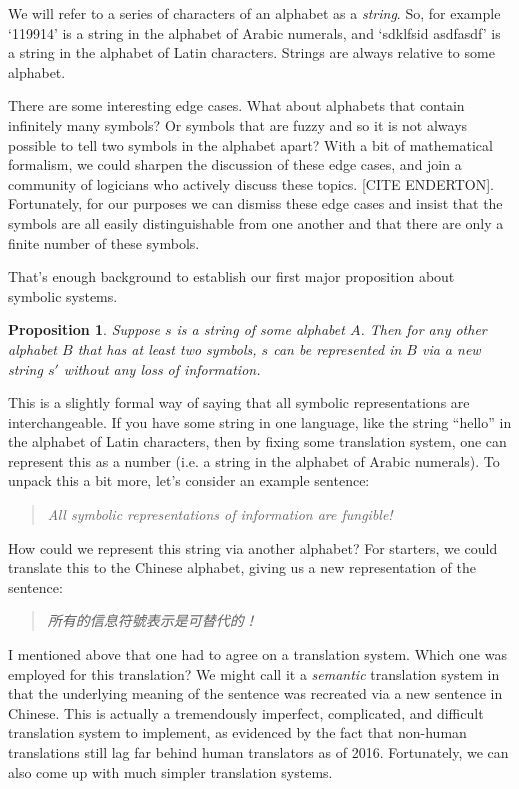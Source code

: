 \documentclass[UTF8]{book}
\newtheorem{theorem}{Proposition}
\begin{document}
\begin{CJK}{UTF8}{gbsn}
We will refer to a series of characters of an alphabet as a \emph{string}. So, for example `119914' is a string in the alphabet of Arabic numerals, and `sdklfsid asdfasdf' is a string in the alphabet of Latin characters. Strings are always relative to some alphabet.

There are some interesting edge cases. What about alphabets that contain infinitely many symbols? Or symbols that are fuzzy and so it is not always possible to tell two symbols in the alphabet apart? With a bit of mathematical formalism, we could sharpen the discussion of these edge cases, and join a community of logicians who actively discuss these topics. [CITE ENDERTON]. Fortunately, for our purposes we can dismiss these edge cases and insist that the symbols are all easily distinguishable from one another and that there are only a finite number of these symbols.

That's enough background to establish our first major proposition about symbolic systems.

\begin{theorem}
Suppose $s$ is a string of some alphabet $A$. Then for any other alphabet $B$ that has at least two symbols, $s$ can be represented in $B$ via a new string $s'$ without any loss of information.
\end{theorem}

This is a slightly formal way of saying that all symbolic representations are interchangeable. If you have some string in one language, like the string ``hello'' in the alphabet of Latin characters, then by fixing some translation system, one can represent this as a number (i.e. a string in the alphabet of Arabic numerals). To unpack this a bit more, let's consider an example sentence:

\begin{quotation}
\centering
\emph{All symbolic representations of information are fungible!}
\end{quotation}

How could we represent this string via another alphabet? For starters, we could translate this to the Chinese alphabet, giving us a new representation of the sentence:

\begin{quotation}
\centering
\emph{所有的信息符號表示是可替代的！}
\end{quotation}

I mentioned above that one had to agree on a translation system.  Which one was employed for this translation? We might call it a \emph{semantic} translation system in that the underlying meaning of the sentence was recreated via a new sentence in Chinese. This is actually a tremendously imperfect, complicated, and difficult translation system to implement, as evidenced by the fact that non-human translations still lag far behind human translators as of 2016. Fortunately, we can also come up with much simpler translation systems.


\end{CJK}
\end{document}
